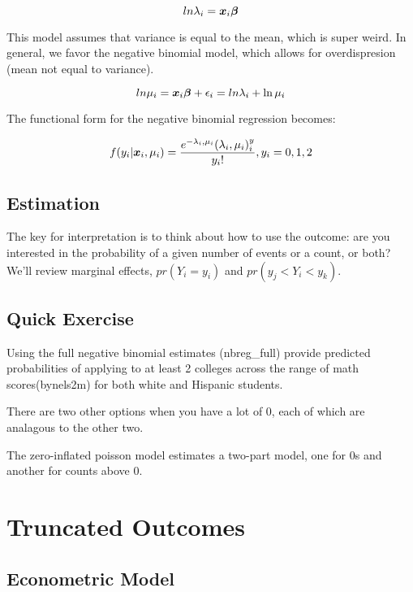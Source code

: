\documentclass[12 pt]{article}
\begin{document}
\begin{equation}
  \label{eq:2}
  ln \lambda_i=\boldsymbol{x}_i\boldsymbol{\beta}
\end{equation}

This model assumes that variance is equal to the mean, which is super weird. In general, we favor the negative binomial model, which allows for overdispresion (mean not equal to variance). 

\begin{equation}
  \label{eq:3}
  ln \mu_i=\boldsymbol{x}_i\boldsymbol{\beta} +\epsilon_i= ln \lambda_i +\ln \mu_i
\end{equation}

The functional form for the negative binomial regression becomes:

\begin{equation}
  \label{eq:4}
  f(y_i|\boldsymbol{x}_i, \mu_i)=\frac{e^{-\lambda_i,\mu_i}(\lambda_i,\mu_i)^y_i}{y_i!}, y_i=0,1,2
\end{equation}


\subsection{Estimation}
The key for interpretation is to think about how to use the outcome: are you interested in the probability of a given number of events or a count, or both? We'll review marginal effects, $pr(Y_i=y_i)$ and $pr(y_j<Y_i<y_k)$.


\subsection{Quick Exercise}
\label{sec:quick-exercise}

Using the full negative binomial estimates (nbreg\_full) provide predicted probabilities of applying to at least 2 colleges across the range of math scores(bynels2m) for both white and Hispanic students. 

There are two other options when you have a lot of 0, each of which
are analagous to the other two.

The zero-inflated poisson model estimates a two-part model, one for 0s
and another for counts above 0. 


\section{Truncated Outcomes}

\subsection{Econometric Model}
\end{document}
